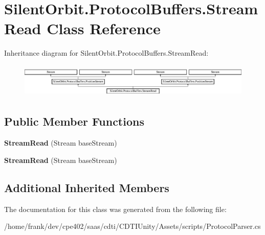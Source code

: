 \hypertarget{class_silent_orbit_1_1_protocol_buffers_1_1_stream_read}{}\section{Silent\+Orbit.\+Protocol\+Buffers.\+Stream\+Read Class Reference}
\label{class_silent_orbit_1_1_protocol_buffers_1_1_stream_read}
Inheritance diagram for Silent\+Orbit.\+Protocol\+Buffers.\+Stream\+Read\+:\begin{figure}[H]
\begin{center}
\leavevmode
\includegraphics[height=1.627907cm]{class_silent_orbit_1_1_protocol_buffers_1_1_stream_read}
\end{center}
\end{figure}
\subsection*{Public Member Functions}
\begin{DoxyCompactItemize}
\item 
\hypertarget{class_silent_orbit_1_1_protocol_buffers_1_1_stream_read_a79f15b6f4801903fe6f4043e89d1b932}{}{\bfseries Stream\+Read} (Stream base\+Stream)\label{class_silent_orbit_1_1_protocol_buffers_1_1_stream_read_a79f15b6f4801903fe6f4043e89d1b932}

\item 
\hypertarget{class_silent_orbit_1_1_protocol_buffers_1_1_stream_read_a79f15b6f4801903fe6f4043e89d1b932}{}{\bfseries Stream\+Read} (Stream base\+Stream)\label{class_silent_orbit_1_1_protocol_buffers_1_1_stream_read_a79f15b6f4801903fe6f4043e89d1b932}

\end{DoxyCompactItemize}
\subsection*{Additional Inherited Members}


The documentation for this class was generated from the following file\+:\begin{DoxyCompactItemize}
\item 
/home/frank/dev/cpe402/saas/cdti/\+C\+D\+T\+I\+Unity/\+Assets/scripts/Protocol\+Parser.\+cs\end{DoxyCompactItemize}
